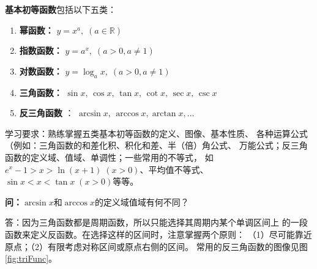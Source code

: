 {\bf 基本初等函数}包括以下五类：
\begin{enumerate}
  \setlength{\itemindent}{1cm}
  \item {\bf 幂函数：} $y=x^a,\; (a\in\mathbb{R})$
  \item {\bf 指数函数：} $y=a^x,\; (a>0,a\ne 1)$
  \item {\bf 对数函数：} $y=\log_ax,\; (a>0,a\ne 1)$
  \item {\bf 三角函数：} $\sin x, \,\cos x,\, \tan x, \,\cot
  x,\, \sec x,\, \csc x$
  \item {\bf 反三角函数} ：
  $\arcsin x, \,\arccos x, \arctan x,\ldots$
\end{enumerate}

{\baa 学习要求：熟练掌握五类基本初等函数的定义、图像、基本性质、
各种运算公式（例如：三角函数的和差化积、积化和差、半（倍）角公式、
万能公式；反三角函数的定义域、值域、单调性；一些常用的不等式，
如$e^x-1>x>\ln(x+1)\;(x>0)$、平均值不等式、
$\sin x<x<\tan x\;(x>0)$等等。}

\bs
{\bf 问：}$\arcsin x$和$\arccos x$的定义域值域有何不同？

答：因为三角函数都是周期函数，所以只能选择其周期内某个单调区间上
的一段函数来定义反函数。在选择这样的区间时，注意掌握两个原则：
（1）尽可能靠近原点；（2）有限考虑对称区间或原点右侧的区间。
常用的反三角函数的图像见图\ref{fig:triFunc}。

